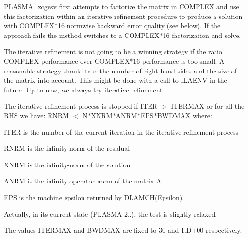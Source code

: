 P\+L\+A\+S\+M\+A\+\_\+zcgesv first attempts to factorize the matrix in C\+O\+M\+P\+L\+E\+X and use this factorization within an iterative refinement procedure to produce a solution with C\+O\+M\+P\+L\+E\+X$\ast$16 normwise backward error quality (see below). If the approach fails the method switches to a C\+O\+M\+P\+L\+E\+X$\ast$16 factorization and solve.

The iterative refinement is not going to be a winning strategy if the ratio C\+O\+M\+P\+L\+E\+X performance over C\+O\+M\+P\+L\+E\+X$\ast$16 performance is too small. A reasonable strategy should take the number of right-\/hand sides and the size of the matrix into account. This might be done with a call to I\+L\+A\+E\+N\+V in the future. Up to now, we always try iterative refinement.

The iterative refinement process is stopped if I\+T\+E\+R $>$ I\+T\+E\+R\+M\+A\+X or for all the R\+H\+S we have\+: R\+N\+R\+M $<$ N$\ast$\+X\+N\+R\+M$\ast$\+A\+N\+R\+M$\ast$\+E\+P\+S$\ast$\+B\+W\+D\+M\+A\+X where\+:


\begin{DoxyItemize}
\item I\+T\+E\+R is the number of the current iteration in the iterative refinement process
\item R\+N\+R\+M is the infinity-\/norm of the residual
\item X\+N\+R\+M is the infinity-\/norm of the solution
\item A\+N\+R\+M is the infinity-\/operator-\/norm of the matrix A
\item E\+P\+S is the machine epsilon returned by D\+L\+A\+M\+C\+H(\textquotesingle{}Epsilon\textquotesingle{}).
\end{DoxyItemize}

Actually, in its current state (P\+L\+A\+S\+M\+A 2..), the test is slightly relaxed.

The values I\+T\+E\+R\+M\+A\+X and B\+W\+D\+M\+A\+X are fixed to 30 and 1.\+D+00 respectively.


